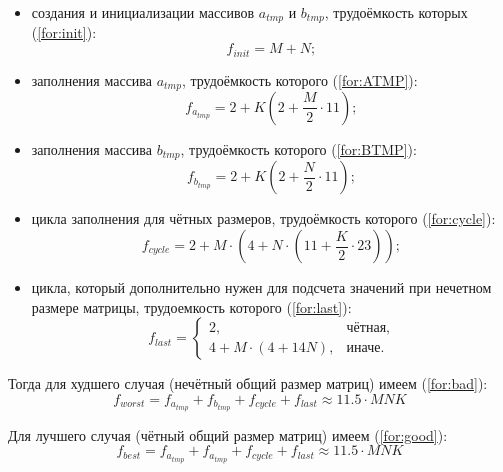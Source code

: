 \begin{itemize}
	\item создания и инициализации массивов $a_{tmp}$ и $b_{tmp}$, трудоёмкость которых (\ref{for:init}):
	\begin{equation}
		\label{for:init}
		f_{init} = M + N;
	\end{equation}

	\item заполнения массива $a_{tmp}$, трудоёмкость которого (\ref{for:ATMP}):
	\begin{equation}
		\label{for:ATMP}
		f_{a_{tmp}} = 2 + K (2 + \frac{M}{2} \cdot 11);
	\end{equation}

	\item заполнения массива $b_{tmp}$, трудоёмкость которого (\ref{for:BTMP}):
	\begin{equation}
		\label{for:BTMP}
		f_{b_{tmp}} = 2 + K (2 + \frac{N}{2} \cdot 11);
	\end{equation}

	\item цикла заполнения для чётных размеров, трудоёмкость которого (\ref{for:cycle}):
	\begin{equation}
		\label{for:cycle}
		f_{cycle} = 2 + M \cdot (4 + N \cdot (11 + \frac{K}{2} \cdot 23));
	\end{equation}

	\item цикла, который дополнительно нужен для подсчета значений при нечетном размере матрицы, трудоемкость которого (\ref{for:last}):
	\begin{equation}
		\label{for:last}
		f_{last} = \begin{cases}
			2, & \text{чётная,}\\
			4 + M \cdot (4 + 14N), & \text{иначе.}
		\end{cases}
	\end{equation}
\end{itemize}

Тогда для худшего случая (нечётный общий размер матриц) имеем (\ref{for:bad}):
\begin{equation}
	\label{for:bad}
	f_{worst} =  f_{a_{tmp}} + f_{b_{tmp}} + f_{cycle} + f_{last}\approx 11.5 \cdot MNK
\end{equation}

Для лучшего случая (чётный общий размер матриц) имеем (\ref{for:good}):
\begin{equation}
	\label{for:good}
f_{best} =  f_{a_{tmp}} + f_{a_{tmp}} + f_{cycle} + f_{last} \approx 11.5 \cdot MNK
\end{equation}


